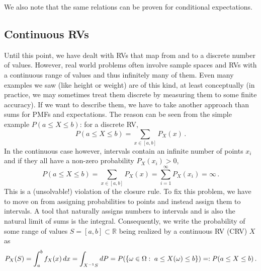 We also note that the same relations can be proven for conditional expectations.



	\subsection{Continuous RVs}\label{subsec:crvs}
Until this point, we have dealt with RVs that map from and to a discrete number of values. However, real world problems often involve sample spaces and RVs with a continuous range of values and thus infinitely many of them. Even many examples we saw (like height or weight) are of this kind, at least conceptually (in practice, we may sometimes treat them discrete by measuring them to some finite accuracy). If we want to describe them, we have to take another approach than sums for PMFs and expectations. The reason can be seen from the simple example $P(a \leq X \leq b)$: for a discrete RV,
\begin{equation}
P(a \leq X \leq b) = \sum_{x \in [a, b]} P_X(x) \, .
\end{equation}
In the continuous case however, intervals contain an infinite number of points $x_i$ and if they all have a non-zero probability $P_X(x_i) > 0$,
\begin{equation}
P(a \leq X \leq b) = \sum_{x \in [a, b]} P_X(x) = \sum_{i = 1}^\infty P_X(x_i) = \infty \, .
\end{equation}
This is a (unsolvable!) violation of the closure rule. To fix this problem, we have to move on from assigning probabilities to points and instead assign them to intervals. A tool that naturally assigns numbers to intervals and is also the natural limit of sums is the integral. Consequently, we write the probability of some range of values $S = [a, b] \subset \mathbb{R}$ being realized by a continuous RV (CRV) $X$ as
\begin{equation}\label{eq:distr_crv}
P_X(S) = \int_a^b f_X(x) \, dx = \int_{X^{-1} S} dP = P\qty(\qty{\omega \in \Omega: \; a \leq X(\omega) \leq b}) =: P(a \leq X \leq b) \, .
\end{equation}
